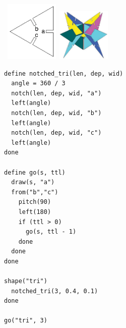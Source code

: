 \documentclass[times, 10pt,twocolumn]{article}
\makeatletter
\newenvironment{subfloat}%
{\def\caption##1{\gdef\subcapsave{\relax##1}}%
\let\subcapsave=\@empty %
\let\sf@oldlabel=\label 
\def\label##1{\xdef\sublabsave{\noexpand\label{##1}}}%
\let\sublabsave\relax %
\setbox\subfigbox\hbox 
\bgroup}%
{\egroup %
\let\label=\sf@oldlabel 
\subfigure[\subcapsave]{\box\subfigbox}}%
\makeatother
\begin{document}
\begin{figure}[h]

  \begin{minipage}{}
    \begin{subfloat}
      \includegraphics[width=1.0in]{notched_triangle.pdf}
      \includegraphics[width=1.0in]{shapes-complete.pdf}
    \end{subfloat}
  \end{minipage}

  \begin{subfloat}
    \begin{minipage}{2.6in}
      \footnotesize
\begin{verbatim}
define notched_tri(len, dep, wid)
  angle = 360 / 3
  notch(len, dep, wid, "a")
  left(angle)
  notch(len, dep, wid, "b")
  left(angle)
  notch(len, dep, wid, "c")
  left(angle)
done

define go(s, ttl)
  draw(s, "a")
  from("b","c")
    pitch(90)
    left(180)
    if (ttl > 0)
      go(s, ttl - 1)
    done
  done
done

shape("tri")
  notched_tri(3, 0.4, 0.1)
done

go("tri", 3)
\end{verbatim}
    \end{minipage}
  \end{subfloat}
  \caption{Recursive \nohyphens{FlatLang} code demonstrating shape
    definition and drawing.}
  \label{fig:shapes}
\end{figure}
\end{document}
